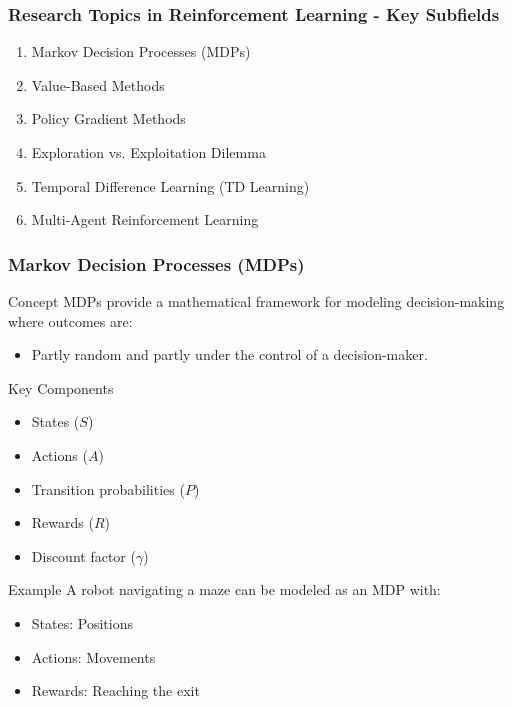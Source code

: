 \documentclass[aspectratio=169]{beamer}
\begin{document}
\begin{frame}[fragile]
    \frametitle{Research Topics in Reinforcement Learning - Key Subfields}
    \begin{enumerate}
        \item Markov Decision Processes (MDPs)
        \item Value-Based Methods
        \item Policy Gradient Methods
        \item Exploration vs. Exploitation Dilemma
        \item Temporal Difference Learning (TD Learning)
        \item Multi-Agent Reinforcement Learning
    \end{enumerate}
\end{frame}

\begin{frame}[fragile]
    \frametitle{Markov Decision Processes (MDPs)}
    \begin{block}{Concept}
        MDPs provide a mathematical framework for modeling decision-making where outcomes are:
        \begin{itemize}
            \item Partly random and partly under the control of a decision-maker.
        \end{itemize}
    \end{block}
    \begin{block}{Key Components}
        \begin{itemize}
            \item States ($S$)
            \item Actions ($A$)
            \item Transition probabilities ($P$)
            \item Rewards ($R$)
            \item Discount factor ($\gamma$)
        \end{itemize}
    \end{block}
    \begin{block}{Example}
        A robot navigating a maze can be modeled as an MDP with:
        \begin{itemize}
            \item States: Positions
            \item Actions: Movements
            \item Rewards: Reaching the exit
        \end{itemize}
    \end{block}
\end{frame}
\end{document}
